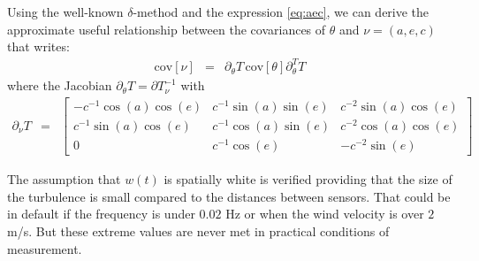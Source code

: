 \documentclass[graybox]{svmult/styles/svmult}
\newcommand{\cov}[1]{\mathrm{cov}\left[ #1 \right]}
\begin{document}
\begin{itemize}
Using the well-known $\delta$-method \cite{casella2002statistical} and the expression \eqref{eq:aec}, we can derive the approximate useful relationship between the covariances of $\theta$ and $\nu=(a,e,c)$ that writes:
\begin{eqnarray}
\label{eq:covthetacovnu}
\cov{\nu}&=&\partial_{\theta} T \, \cov{\theta}\partial_{\theta}^{T} T
\end{eqnarray}
where the Jacobian $\partial_{\theta} T=\partial T_{\nu}^{-1}$ with
\begin{eqnarray*}
\partial_{\nu} T
&=&\begin{bmatrix}
-c^{-1}\cos(a)\cos(e)&c^{-1}\sin(a)\sin(e)&c^{-2}\sin(a)\cos(e)
\\
c^{-1}\sin(a)\cos(e)&c^{-1}\cos(a)\sin(e)&c^{-2}\cos(a)\cos(e)
\\
0&c^{-1}\cos(e)&-c^{-2}\sin(e)
\end{bmatrix}
\end{eqnarray*}


\end{itemize}

 The assumption that $w(t)$ is spatially white is verified providing that the size of the turbulence is small compared to the distances between sensors. That could be in default if the frequency is under $0.02$ Hz or when the wind velocity is over $2$ m/s. But these extreme values are never met in practical conditions of measurement.



\end{document}
